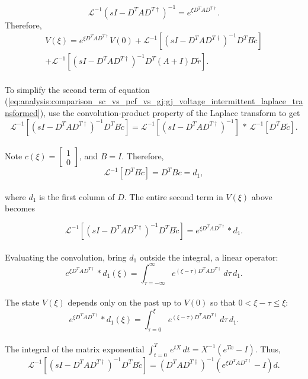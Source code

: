 $$
	\mathcal{L}^{-1} 
	\left(
		sI - D^T A D^{T \dagger}
	\right)^{-1}
	= e^{\xi D^T A D^{T \dagger}}.
$$
Therefore, 
\begin{multline}
\label{eq:analysis:comparison_sc_vs_pcf_vs_gj:gj_voltage_intermittent_laplace_transformed}
	V(\xi)
	=
	e^{\xi D^T A D^{T \dagger}} V(0)
	+
	\mathcal{L}^{-1}
	\left[
		\left(
			sI - D^T A D^{T \dagger}
		\right)^{-1}
		D^T B \tilde{c}
	\right]
	\\
		+ 
	\mathcal{L}^{-1}
	\left[
		\left(
			sI - D^T A D^{T \dagger}
		\right)^{-1}
		D^T 
		\left(
			A + I
		\right)	
		D \tilde{r}
	\right].
\end{multline}
\\
To simplify the second term of equation (\ref{eq:analysis:comparison_sc_vs_pcf_vs_gj:gj_voltage_intermittent_laplace_transformed}), use the convolution-product property of the Laplace transform to get
\\
$$
	\mathcal{L}^{-1}
	\left[
		\left(
			sI - D^T A D^{T \dagger}
		\right)^{-1}
		D^T B \tilde{c}
	\right]
	=
	\mathcal{L}^{-1}
	\left[
			\left(
			sI - D^T A D^{T \dagger}
		\right)^{-1}		
	\right]
	\,	* \, 
		\mathcal{L}^{-1}
	\left[
			D^T B \tilde{c}
	\right].
$$
\\
Note $c(\xi) = \begin{bmatrix}
1 \\ 0
\end{bmatrix}$, and $B = I$. Therefore,
\\
$$
		\mathcal{L}^{-1}
	\left[
			D^T B \tilde{c}
	\right] = D^T B c = d_1,
$$\\
where $d_1$ is the first column of $D$.
The entire second term in  $V(\xi)$ above becomes

$$
	\mathcal{L}^{-1}
	\left[
		\left(
			sI - D^T A D^{T \dagger}
		\right)^{-1}
		D^T B \tilde{c}
	\right]
	=
	e^{\xi D^T A D^{T \dagger}} * d_1.
$$
\\
Evaluating the convolution, bring $d_1$ outside the integral, a linear operator:
$$
	e^{\xi D^T A D^{T \dagger}} * d_1 (\xi)
	=
	\int_{\tau=-\infty}^{\infty}
		e^{
		\left(
			\xi - \tau
		\right)
		 D^T A D^{T \dagger}} 
	\, d\tau
	 \, d_1.
$$
\\
The state $V(\xi)$ depends only on the past up to $V(0)$ so that $0 < \xi - \tau \leq  \xi$: 
\\
$$
	e^{\xi D^T A D^{T \dagger}} * d_1 (\xi)
	=
	\int_{\tau=0}^{\xi}
		e^{
		\left(
			\xi - \tau
		\right)
		 D^T A D^{T \dagger}}  
	\, d\tau
	\, d_1.
$$
\\
The integral of the matrix exponential $\int_{t=0}^{T} \, e^{tX} \, dt= X^{-1} \left(e^{Tx} - I \right)$. Thus,
\\
\begin{equation}
\label{eq:analysis:comparison_sc_vs_pcf_vs_gj:gj_voltage_intermittent_laplace_transformed_term_2}
	\mathcal{L}^{-1}
	\left[
		\left(
			sI - D^T A D^{T \dagger}
		\right)^{-1}
		D^T B \tilde{c}
	\right]
=
\left(
	D^T A D^{T \dagger}
\right)^{-1}
\left(
	e^{\xi D^T A D^{T \dagger}} - I
\right)
d.
\end{equation}

